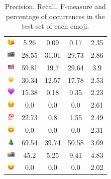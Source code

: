 \documentclass{article}
\begin{document}
\begin{table}
\begin{tabular}{|c|ccc|c|}
\includegraphics[height=0.37cm,width=0.37cm]{img/face_blowing_a_kiss.png} & 5.26 & 0.09 & 0.17 & 2.35\\ 
\includegraphics[height=0.37cm,width=0.37cm]{img/camera.png} & 28.55 & 31.01 & 29.73 & 2.86\\ 
\includegraphics[height=0.37cm,width=0.37cm]{img/United_States.png} & 59.81 & 19.7 & 29.64 & 3.9\\ 
\includegraphics[height=0.37cm,width=0.37cm]{img/sun.png} & 30.34 & 12.57 & 17.78 & 2.53\\ 
\includegraphics[height=0.37cm,width=0.37cm]{img/purple_heart.png} & 15.38 & 0.18 & 0.35 & 2.23\\ 
\includegraphics[height=0.37cm,width=0.37cm]{img/winking_face.png} & 0.0 & 0.0 & 0.0 & 2.61\\ 
\includegraphics[height=0.37cm,width=0.37cm]{img/hundred_points.png} & 22.73 & 0.8 & 1.55 & 2.49\\ 
\includegraphics[height=0.37cm,width=0.37cm]{img/beaming_face_with_smiling_eyes.png} & 0.0 & 0.0 & 0.0 & 2.31\\ 
\includegraphics[height=0.37cm,width=0.37cm]{img/Christmas_tree.png} & 69.54 & 39.74 & 50.58 & 3.09\\ 
\includegraphics[height=0.37cm,width=0.37cm]{img/camera_with_flash.png} & 45.2 & 5.25 & 9.41 & 4.83\\ 
\includegraphics[height=0.37cm,width=0.37cm]{img/winking_face_with_tongue.png} & 0.0 & 0.0 & 0.0 & 2.02\\ 

\hline
\end{tabular}
\caption{\label{table:emoji_detailed} Precision, Recall, F-measure and percentage of occurrences in the test set of each emoji.}
\end{table}
\end{document}
